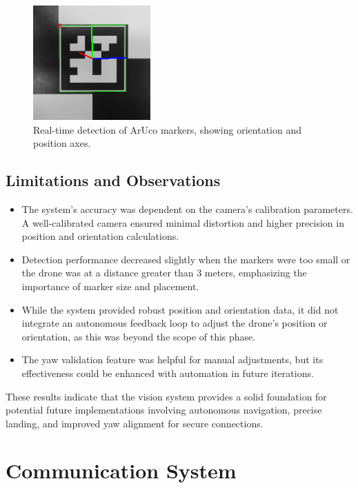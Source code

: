 \begin{figure}[H]
    \centering
    \includegraphics[width=0.4\textwidth]{pictures/aruco_detection.png}
    \caption{Real-time detection of ArUco markers, showing orientation and position axes.}
    \label{fig:aruco_detection_results}
\end{figure}

\subsection{Limitations and Observations}
\begin{itemize}
    \item The system's accuracy was dependent on the camera's calibration parameters. A well-calibrated camera ensured minimal distortion and higher precision in position and orientation calculations.
    \item Detection performance decreased slightly when the markers were too small or the drone was at a distance greater than 3 meters, emphasizing the importance of marker size and placement.
    \item While the system provided robust position and orientation data, it did not integrate an autonomous feedback loop to adjust the drone's position or orientation, as this was beyond the scope of this phase.
    \item The yaw validation feature was helpful for manual adjustments, but its effectiveness could be enhanced with automation in future iterations.
\end{itemize}

These results indicate that the vision system provides a solid foundation for potential future implementations involving autonomous navigation, precise landing, and improved yaw alignment for secure connections.

\section{Communication System}

